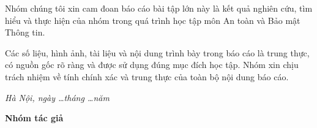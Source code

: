 
Nhóm chúng tôi xin cam đoan báo cáo bài tập lớn này là kết quả nghiên cứu, tìm hiểu và thực hiện của nhóm trong quá trình học tập môn An toàn và Bảo mật Thông tin.

Các số liệu, hình ảnh, tài liệu và nội dung trình bày trong báo cáo là trung thực, có nguồn gốc rõ ràng và được sử dụng đúng mục đích học tập. Nhóm xin chịu trách nhiệm về tính chính xác và trung thực của toàn bộ nội dung báo cáo.

\vspace{1cm}

\begin{flushright}
\begin{minipage}{8cm}
\centering
\textit{Hà Nội, ngày \ldots tháng \ldots năm \Nam}

\vspace{0.5cm}

\textbf{Nhóm tác giả}

\vspace{2cm}

\end{minipage}
\end{flushright}
